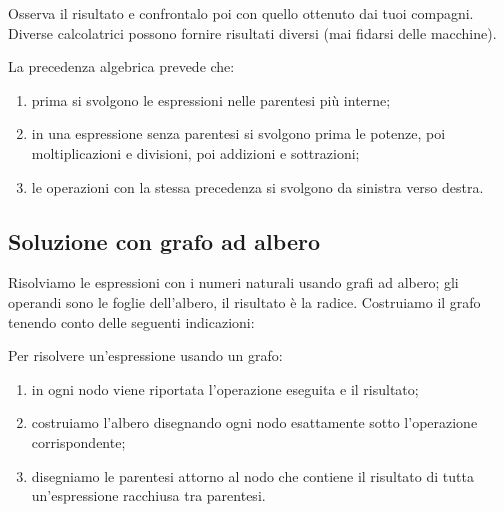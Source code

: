 Osserva il risultato e confrontalo poi con quello ottenuto dai tuoi 
compagni. 
Diverse calcolatrici possono fornire risultati diversi (mai fidarsi delle
macchine).

La precedenza algebrica prevede che:

\begin{enumerate} [nosep]
 \item prima si svolgono le espressioni nelle parentesi più interne; 
 \item in una espressione senza parentesi si svolgono prima le potenze, 
  poi moltiplicazioni e divisioni, poi addizioni e sottrazioni;
 \item le operazioni con la stessa precedenza si svolgono da sinistra verso 
  destra.
\end{enumerate}

\subsection{Soluzione con grafo ad albero}

Risolviamo le espressioni con i numeri naturali usando grafi ad albero;
gli operandi sono le foglie dell'albero, il risultato è la radice. 
Costruiamo il grafo tenendo conto delle seguenti indicazioni:

\begin{procedura}
 Per risolvere un'espressione usando un grafo:
\begin{enumerate} [noitemsep]
 \item in ogni nodo viene riportata l'operazione eseguita e il risultato;
 \item costruiamo l'albero disegnando ogni nodo esattamente sotto
  l'operazione corrispondente;
 \item disegniamo le parentesi attorno al nodo che contiene il
  risultato di tutta un'espressione racchiusa tra parentesi.
\end{enumerate}
\end{procedura}


